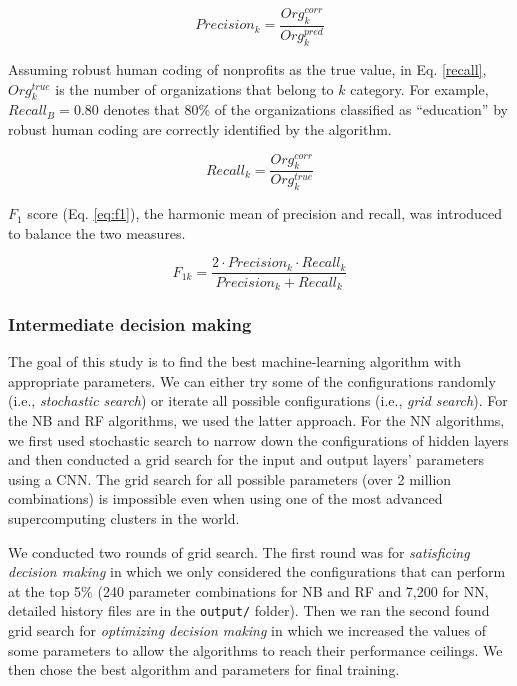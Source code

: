 \documentclass[11pt]{article}
\begin{document}
\begin{equation} \label{precision}
    Precision_{k}=\frac{Org^{corr}_{k}}{Org^{pred}_{k}}
\end{equation}

Assuming robust human coding of nonprofits as the true value, in Eq. \ref{recall}, $Org^{true}_{k}$ is the number of organizations that belong to $k$ category. For example, $Recall_{B}=0.80$ denotes that 80\% of the organizations classified as ``education'' by robust human coding are correctly identified by the algorithm.

\begin{equation} \label{recall}
    Recall_{k}=\frac{Org^{corr}_{k}}{Org^{true}_{k}}
\end{equation}

$F_1$ score (Eq. \ref{eq:f1}), the harmonic mean of precision and recall, was introduced to balance the two measures.

\begin{equation} \label{eq:f1}
    F_{1k}=\frac{2 \cdot Precision_{k} \cdot Recall_{k}}{Precision_{k} + Recall_{k}}
\end{equation}


\subsubsection{Intermediate decision making}

The goal of this study is to find the best machine-learning algorithm with appropriate parameters. We can either try some of the configurations randomly (i.e., \textit{stochastic search}) or iterate all possible configurations (i.e., \textit{grid search}). For the NB and RF algorithms, we used the latter approach. For the NN algorithms, we first used stochastic search to narrow down the configurations of hidden layers and then conducted a grid search for the input and output layers' parameters using a CNN. The grid search for all possible parameters (over 2 million combinations) is impossible even when using one of the most advanced supercomputing clusters in the world.

We conducted two rounds of grid search. The first round was for \textit{satisficing decision making} in which we only considered the configurations that can perform at the top 5\% (240 parameter combinations for NB and RF and 7,200 for NN, detailed history files are in the \texttt{output/} folder). Then we ran the second found grid search for \textit{optimizing decision making} in which we increased the values of some parameters to allow the algorithms to reach their performance ceilings. We then chose the best algorithm and parameters for final training.
\end{document}
